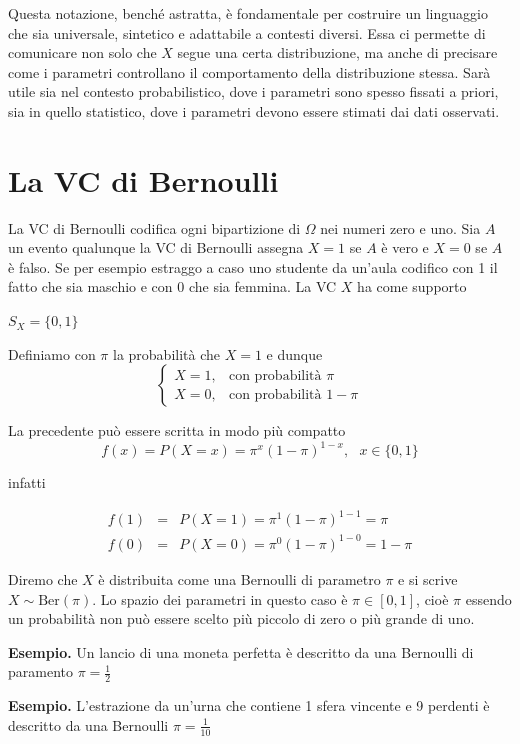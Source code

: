 \documentclass[
  11pt,
]{book}
\theoremstyle{mytheoremstyle}
\theoremstyle{mydefstyle}
\begin{document}
Questa notazione, benché astratta, è fondamentale per costruire un linguaggio che sia universale, sintetico e adattabile a contesti diversi. Essa ci permette di comunicare non solo che \(X\) segue una certa distribuzione, ma anche di precisare come i parametri controllano il comportamento della distribuzione stessa. Sarà utile sia nel contesto probabilistico, dove i parametri sono spesso fissati a priori, sia in quello statistico, dove i parametri devono essere stimati dai dati osservati.

\section{La VC di Bernoulli}\label{la-vc-di-bernoulli}

La VC di Bernoulli codifica ogni bipartizione di \(\Omega\) nei numeri zero e uno.
Sia \(A\) un evento qualunque la VC di Bernoulli assegna \(X=1\) se \(A\) è vero e \(X=0\) se \(A\) è falso.
Se per esempio estraggo a caso uno studente da un'aula codifico con 1 il fatto che sia maschio e con 0 che
sia femmina. La VC \(X\) ha come supporto

\(S_X=\{0,1\}\)

Definiamo con \(\pi\) la probabilità che \(X=1\) e dunque
\[\begin{cases} X=1, &\text{con probabilità }  \pi\\
X=0, &\text{con probabilità }  1-\pi
\end{cases}\]

La precedente può essere scritta in modo più compatto
\[
f(x)=P(X=x)=\pi^x(1-\pi)^{1-x}, ~~~x\in\{0,1\}
\]

infatti

\begin{eqnarray*}
f(1) &=& P(X=1) = \pi^1(1-\pi)^{1-1}=\pi \\
f(0) &=& P(X=0) = \pi^0(1-\pi)^{1-0}=1-\pi 
\end{eqnarray*}

Diremo che \(X\) è distribuita come una Bernoulli di parametro \(\pi\) e si scrive \(X\sim\text{Ber}(\pi)\).
Lo spazio dei parametri in questo caso è \(\pi\in[0,1]\), cioè \(\pi\) essendo un probabilità non può
essere scelto più piccolo di zero o più grande di uno.

\textbf{Esempio.}
Un lancio di una moneta perfetta è descritto da una Bernoulli di paramento \(\pi=\frac 1 2\)

\textbf{Esempio.}
L'estrazione da un'urna che contiene 1 sfera vincente e 9 perdenti è descritto da una Bernoulli \(\pi=\frac 1 {10}\)
\end{document}
